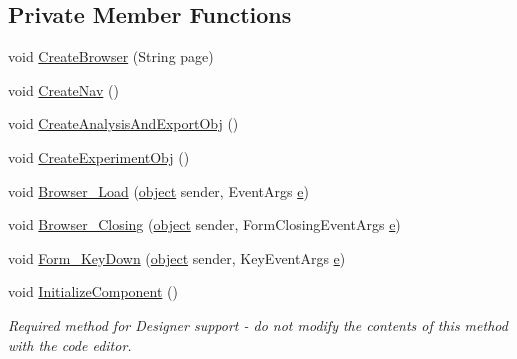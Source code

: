 \subsection*{Private Member Functions}
\begin{DoxyCompactItemize}
\item 
void \hyperlink{class_web_analyzer_1_1_u_i_1_1_h_t_m_l_u_i_afaacdee71a728c1cbe04087351e70395}{Create\+Browser} (String page)
\item 
void \hyperlink{class_web_analyzer_1_1_u_i_1_1_h_t_m_l_u_i_a274870a5d1268fa3a2e40d674cf8e61b}{Create\+Nav} ()
\item 
void \hyperlink{class_web_analyzer_1_1_u_i_1_1_h_t_m_l_u_i_a167ae69309a8f44387164d5f6d8f0c29}{Create\+Analysis\+And\+Export\+Obj} ()
\item 
void \hyperlink{class_web_analyzer_1_1_u_i_1_1_h_t_m_l_u_i_af92127c0a733a77a2363ff1d8b26713b}{Create\+Experiment\+Obj} ()
\item 
void \hyperlink{class_web_analyzer_1_1_u_i_1_1_h_t_m_l_u_i_abc8c290c8b516e80333172298d96eb52}{Browser\+\_\+\+Load} (\hyperlink{_u_i_2_h_t_m_l_resources_2js_2lib_2underscore_8min_8js_aae18b7515bb2bc4137586506e7c0c903}{object} sender, Event\+Args \hyperlink{_u_i_2_h_t_m_l_resources_2js_2lib_2bootstrap_8min_8js_ab5902775854a8b8440bcd25e0fe1c120}{e})
\item 
void \hyperlink{class_web_analyzer_1_1_u_i_1_1_h_t_m_l_u_i_a18e4826c64957f86ccc5726d4b21e38b}{Browser\+\_\+\+Closing} (\hyperlink{_u_i_2_h_t_m_l_resources_2js_2lib_2underscore_8min_8js_aae18b7515bb2bc4137586506e7c0c903}{object} sender, Form\+Closing\+Event\+Args \hyperlink{_u_i_2_h_t_m_l_resources_2js_2lib_2bootstrap_8min_8js_ab5902775854a8b8440bcd25e0fe1c120}{e})
\item 
void \hyperlink{class_web_analyzer_1_1_u_i_1_1_h_t_m_l_u_i_a4ac4c943e02d07235a52edf88d2cc055}{Form\+\_\+\+Key\+Down} (\hyperlink{_u_i_2_h_t_m_l_resources_2js_2lib_2underscore_8min_8js_aae18b7515bb2bc4137586506e7c0c903}{object} sender, Key\+Event\+Args \hyperlink{_u_i_2_h_t_m_l_resources_2js_2lib_2bootstrap_8min_8js_ab5902775854a8b8440bcd25e0fe1c120}{e})
\item 
void \hyperlink{class_web_analyzer_1_1_u_i_1_1_h_t_m_l_u_i_a982fd123521466139710256dee65f7c4}{Initialize\+Component} ()
\begin{DoxyCompactList}\small\item\em Required method for Designer support -\/ do not modify the contents of this method with the code editor. \end{DoxyCompactList}\end{DoxyCompactItemize}
